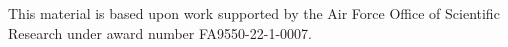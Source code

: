 %
%
%

%
This material is based upon work supported by the Air Force Office of Scientific Research under award number FA9550-22-1-0007.